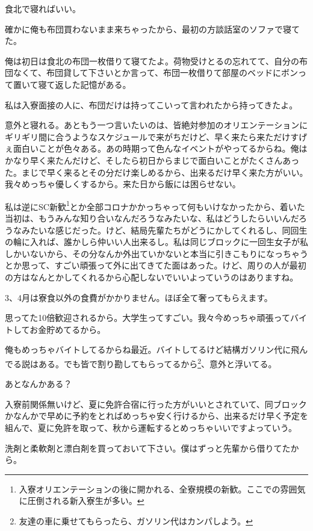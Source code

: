 \begin{multicols}{2}
食北で寝ればいい。

確かに俺も布団買わないまま来ちゃったから、最初の方談話室のソファで寝てた。

俺は初日は食北の布団一枚借りて寝てたよ。荷物受けとるの忘れてて、自分の布団なくて、布団貸して下さいとか言って、布団一枚借りて部屋のベッドにボンって置いて寝て返した記憶がある。

私は入寮面接の人に、布団だけは持ってこいって言われたから持ってきたよ。

意外と寝れる。あともう一つ言いたいのは、皆絶対参加のオリエンテーションにギリギリ間に合うようなスケジュールで来がちだけど、早く来たら来ただけすげぇ面白いことが色々ある。あの時期って色んなイベントがやってるからね。俺はかなり早く来たんだけど、そしたら初日からまじで面白いことがたくさんあった。まじで早く来るとその分だけ楽しめるから、出来るだけ早く来た方がいい。我々めっちゃ優しくするから。来た日から飯には困らせない。

私は逆にSC新歓\footnote{入寮オリエンテーションの後に開かれる、全寮規模の新歓。ここでの雰囲気に圧倒される新入寮生が多い。}とか全部コロナかかっちゃって何もいけなかったから、着いた当初は、もうみんな知り合いなんだろうなみたいな、私はどうしたらいいんだろうなみたいな感じだった。けど、結局先輩たちがどうにかしてくれるし、同回生の輪に入れば、誰かしら仲いい人出来るし。私は同じブロックに一回生女子が私しかいないから、その分なんか外出ていかないと本当に引きこもりになっちゃうとか思って、すごい頑張って外に出てきてた面はあった。けど、周りの人が最初の方はなんとかしてくれるから心配しないでいいよっていうのはありますね。

3、4月は寮食以外の食費がかかりません。ほぼ全て奢ってもらえます。

思ってた10倍歓迎されるから。大学生ってすごい。我々今めっちゃ頑張ってバイトしてお金貯めてるから。

俺もめっちゃバイトしてるからね最近。バイトしてるけど結構ガソリン代に飛んでる説はある。でも皆で割り勘してもらってるから\footnote{ 友達の車に乗せてもらったら、ガソリン代はカンパしよう。}、意外と浮いてる。

あとなんかある？

入寮前関係無いけど、夏に免許合宿に行った方がいいとされていて、同ブロックかなんかで早めに予約をとればめっちゃ安く行けるから、出来るだけ早く予定を組んで、夏に免許を取って、秋から運転するとめっちゃいいですよっていう。

洗剤と柔軟剤と漂白剤を買っておいて下さい。僕はずっと先輩から借りてたから。


\end{multicols}
